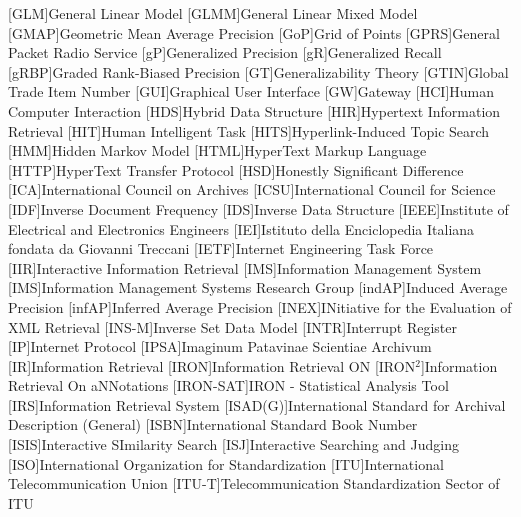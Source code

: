 [GLM]{General Linear Model}
[GLMM]{General Linear Mixed Model}
[GMAP]{Geometric Mean Average Precision}
[GoP]{Grid of Points}
[GPRS]{General Packet Radio Service}
[gP]{Generalized Precision}
[gR]{Generalized Recall}
[gRBP]{Graded Rank-Biased Precision}
[GT]{Generalizability Theory}
[GTIN]{Global Trade Item Number}
[GUI]{Graphical User Interface}
[GW]{Gateway}
[HCI]{Human Computer Interaction}
[HDS]{Hybrid Data Structure}
[HIR]{Hypertext Information Retrieval}
[HIT]{Human Intelligent Task}
[HITS]{Hyperlink-Induced Topic Search}
[HMM]{Hidden Markov Model}
[HTML]{HyperText Markup Language}
[HTTP]{HyperText Transfer Protocol}
[HSD]{Honestly Significant Difference}
[ICA]{International Council on Archives}
[ICSU]{International Council for Science}
[IDF]{Inverse Document Frequency}
[IDS]{Inverse Data Structure}
[IEEE]{Institute of Electrical and Electronics Engineers}
[IEI]{Istituto della Enciclopedia Italiana fondata da Giovanni Treccani}
[IETF]{Internet Engineering Task Force}
[IIR]{Interactive Information Retrieval}
[IMS]{Information Management System}
[IMS]{Information Management Systems Research Group}
[indAP]{Induced Average Precision}
[infAP]{Inferred Average Precision}
[INEX]{INitiative for the Evaluation of \acs{XML} Retrieval}
[INS-M]{Inverse Set Data Model}
[INTR]{Interrupt Register}
[IP]{Internet Protocol}
[IPSA]{Imaginum Patavinae Scientiae Archivum}
[IR]{Information Retrieval}
[IRON]{Information Retrieval ON}
[IRON$^2$]{Information Retrieval On aNNotations}
[IRON-SAT]{\acs{IRON} - Statistical Analysis Tool}
[IRS]{Information Retrieval System}
[ISAD(G)]{International Standard for Archival Description (General)}
[ISBN]{International Standard Book Number}
[ISIS]{Interactive SImilarity Search}
[ISJ]{Interactive Searching and Judging}
[ISO]{International Organization for Standardization}
[ITU]{International Telecommunication Union }
[ITU-T]{Telecommunication Standardization Sector of \acs{ITU}}
